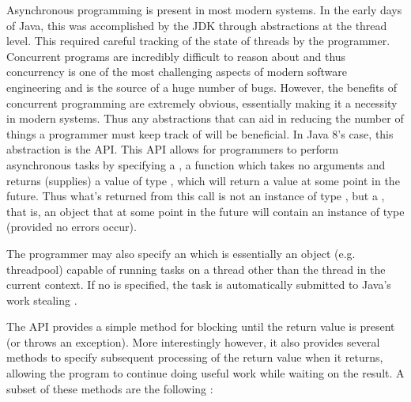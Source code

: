 


Asynchronous programming is present in most modern systems. In the early days of Java, this was accomplished by the JDK through abstractions at the thread level. This required careful tracking of the state of threads by the programmer. Concurrent programs are incredibly difficult to reason about and thus concurrency is one of the most challenging aspects of modern software engineering and is the source of a huge number of bugs. However, the benefits of concurrent programming are extremely obvious, essentially making it a necessity in modern systems. Thus any abstractions that can aid in reducing the number of things a programmer must keep track of will be beneficial. In Java 8's case, this abstraction is the  API. This API allows for programmers to perform asynchronous tasks by specifying a , a function which takes no arguments and returns (supplies) a value of type , which will return a value at some point in the future. Thus what's returned from this call is not an instance of type , but a , that is, an object that at some point in the future will contain an instance of type  (provided no errors occur). 

The programmer may also specify an  \cite{javaExecutor} which is essentially an object (e.g. threadpool) capable of running tasks on a thread other than the thread in the current context. If no  is specified, the task is automatically submitted to Java's work stealing  \cite{javaForkJoinPool}. 

The API provides a simple  method for blocking until the return value is present (or throws an exception). More interestingly however, it also provides several methods to specify subsequent processing of the return value when it returns, allowing the program to continue doing useful work while waiting on the result. A subset of these methods are the following \cite{javaCfArticle}:

